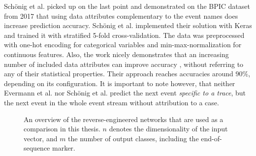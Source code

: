 Schönig et al. \cite{schoenig2018} picked up on the last point and demonstrated on the BPIC dataset from 2017 that using data attributes complementary to the event names does increase prediction accuracy. Schönig et al. implemented their solution with Keras and trained it with stratified 5-fold cross-validation.
The data was preprocessed with one-hot encoding for categorical variables and min-max-normalization for continuous features. Also, the work nicely demonstrates that an increasing number of included data attributes can improve accuracy \cite[p.5]{schoenig2018}, without referring to any of their statistical properties. Their approach reaches accuracies around $90\%$, depending on its configuration. It is important to note however, that neither Evermann et al. nor Schönig et al. predict the next event \textit{specific to a trace}, but the next event in the whole event stream without attribution to a case.

\begin{figure}
\centering
{}
\qquad
{}
\caption{An overview of the reverse-engineered networks that are used as a comparison in this thesis. $n$ denotes the dimensionality of the input vector, and $m$ the number of output classes, including the end-of-sequence marker.}
\label{fig:benchmark-architectures}
\end{figure}

